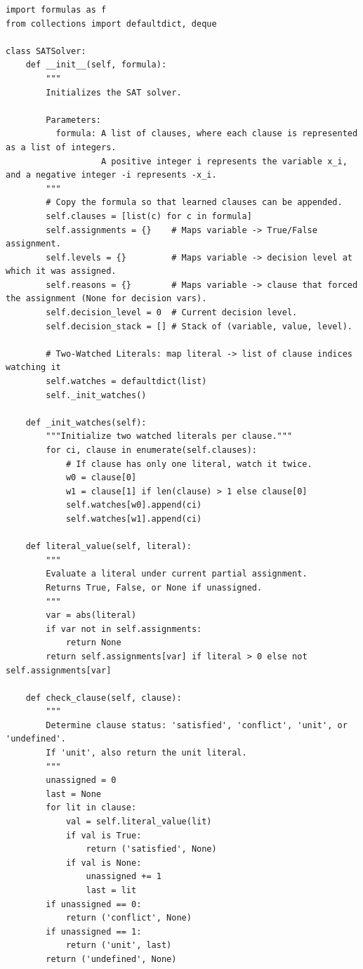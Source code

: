\begin{lstlisting}
import formulas as f
from collections import defaultdict, deque

class SATSolver:
    def __init__(self, formula):
        """
        Initializes the SAT solver.

        Parameters:
          formula: A list of clauses, where each clause is represented as a list of integers.
                   A positive integer i represents the variable x_i, and a negative integer -i represents -x_i.
        """
        # Copy the formula so that learned clauses can be appended.
        self.clauses = [list(c) for c in formula]
        self.assignments = {}    # Maps variable -> True/False assignment.
        self.levels = {}         # Maps variable -> decision level at which it was assigned.
        self.reasons = {}        # Maps variable -> clause that forced the assignment (None for decision vars).
        self.decision_level = 0  # Current decision level.
        self.decision_stack = [] # Stack of (variable, value, level).

        # Two-Watched Literals: map literal -> list of clause indices watching it
        self.watches = defaultdict(list)
        self._init_watches()

    def _init_watches(self):
        """Initialize two watched literals per clause."""
        for ci, clause in enumerate(self.clauses):
            # If clause has only one literal, watch it twice.
            w0 = clause[0]
            w1 = clause[1] if len(clause) > 1 else clause[0]
            self.watches[w0].append(ci)
            self.watches[w1].append(ci)

    def literal_value(self, literal):
        """
        Evaluate a literal under current partial assignment.
        Returns True, False, or None if unassigned.
        """
        var = abs(literal)
        if var not in self.assignments:
            return None
        return self.assignments[var] if literal > 0 else not self.assignments[var]

    def check_clause(self, clause):
        """
        Determine clause status: 'satisfied', 'conflict', 'unit', or 'undefined'.
        If 'unit', also return the unit literal.
        """
        unassigned = 0
        last = None
        for lit in clause:
            val = self.literal_value(lit)
            if val is True:
                return ('satisfied', None)
            if val is None:
                unassigned += 1
                last = lit
        if unassigned == 0:
            return ('conflict', None)
        if unassigned == 1:
            return ('unit', last)
        return ('undefined', None)


\end{lstlisting}

